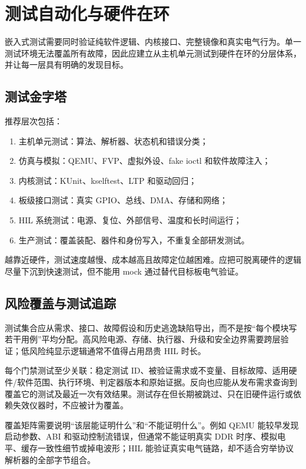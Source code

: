 \chapter{测试自动化与硬件在环}
\label{chap:test-automation-hil}

嵌入式测试需要同时验证纯软件逻辑、内核接口、完整镜像和真实电气行为。单一测试环境无法覆盖所有故障，因此应建立从主机单元测试到硬件在环的分层体系，并让每一层具有明确的发现目标。

\section{测试金字塔}

推荐层次包括：
\begin{enumerate}
  \item 主机单元测试：算法、解析器、状态机和错误分类；
  \item 仿真与模拟：QEMU、FVP、虚拟外设、fake ioctl 和软件故障注入；
  \item 内核测试：KUnit、kselftest、LTP 和驱动回归；
  \item 板级接口测试：真实 GPIO、总线、DMA、存储和网络；
  \item HIL 系统测试：电源、复位、外部信号、温度和长时间运行；
  \item 生产测试：覆盖装配、器件和身份写入，不重复全部研发测试。
\end{enumerate}

越靠近硬件，测试速度越慢、成本越高且故障定位越困难。应把可脱离硬件的逻辑尽量下沉到快速测试，但不能用 mock 通过替代目标板电气验证。

\section{风险覆盖与测试追踪}

测试集合应从需求、接口、故障假设和历史逃逸缺陷导出，而不是按“每个模块写若干用例”平均分配。高风险电源、存储、执行器、升级和安全边界需要跨层验证；低风险纯显示逻辑通常不值得占用昂贵 HIL 时长。

每个门禁测试至少关联：稳定测试 ID、被验证需求或不变量、目标故障、适用硬件/软件范围、执行环境、判定器版本和原始证据。反向也应能从发布需求查询到覆盖它的测试及最近一次有效结果。测试存在但长期被跳过、只在旧硬件运行或依赖失效仪器时，不应被计为覆盖。

覆盖矩阵需要说明“该层能证明什么”和“不能证明什么”。例如 QEMU 能较早发现启动参数、ABI 和驱动控制流错误，但通常不能证明真实 DDR 时序、模拟电平、缓存一致性细节或掉电波形；HIL 能验证真实电气链路，却不适合穷举协议解析器的全部字节组合。

